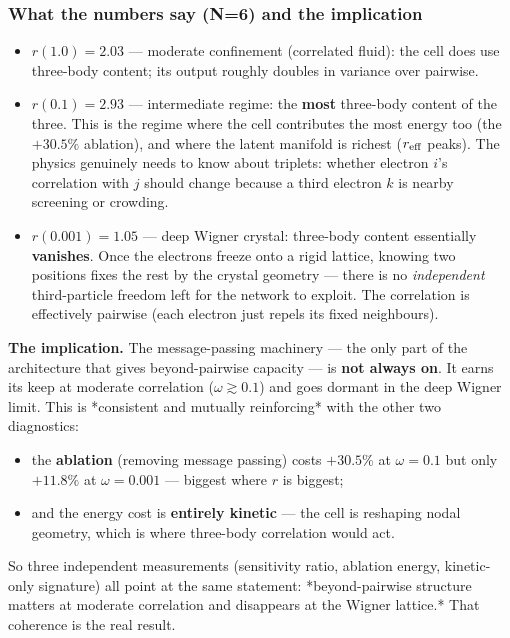 \documentclass[11pt]{article}
\begin{document}
\subsubsection*{What the numbers say (N=6) and the implication}

\begin{itemize}
\item $r(1.0) = 2.03$ --- moderate confinement (correlated fluid): the cell does
use three-body content; its output roughly doubles in variance over
pairwise.
\item $r(0.1) = 2.93$ --- intermediate regime: the \textbf{most} three-body content of
the three. This is the regime where the cell contributes the most energy
too (the $+30.5\%$ ablation), and where the latent manifold is richest
($r_{\rm eff}$ peaks). The physics genuinely needs to know about triplets:
whether electron $i$'s correlation with $j$ should change because a third
electron $k$ is nearby screening or crowding.
\item $r(0.001) = 1.05$ --- deep Wigner crystal: three-body content essentially
\textbf{vanishes}. Once the electrons freeze onto a rigid lattice, knowing two
positions fixes the rest by the crystal geometry --- there is no
\emph{independent} third-particle freedom left for the network to exploit. The
correlation is effectively pairwise (each electron just repels its fixed
neighbours).
\end{itemize}
\textbf{The implication.} The message-passing machinery --- the only part of the
architecture that gives beyond-pairwise capacity --- is \textbf{not always on}.
It earns its keep at moderate correlation ($\omega \gtrsim 0.1$) and goes
dormant in the deep Wigner limit. This is *consistent and mutually
reinforcing* with the other two diagnostics:
\begin{itemize}
\item the \textbf{ablation} (removing message passing) costs $+30.5\%$ at $\omega =
  0.1$ but only $+11.8\%$ at $\omega = 0.001$ --- biggest where $r$ is biggest;
\item and the energy cost is \textbf{entirely kinetic} --- the cell is reshaping nodal
geometry, which is where three-body correlation would act.
\end{itemize}
So three independent measurements (sensitivity ratio, ablation energy,
kinetic-only signature) all point at the same statement: *beyond-pairwise
structure matters at moderate correlation and disappears at the Wigner
lattice.* That coherence is the real result.
\end{document}
